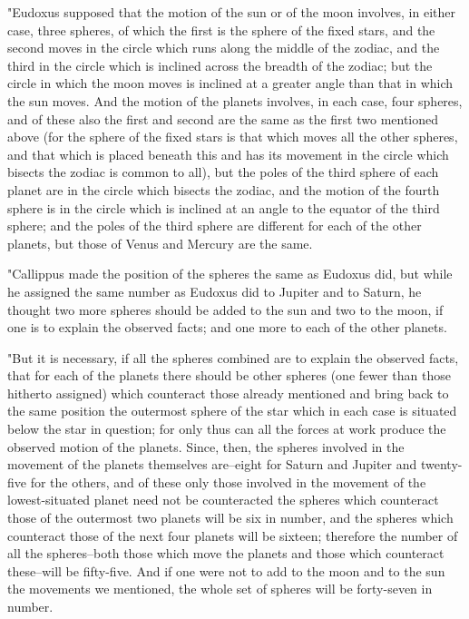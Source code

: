 "Eudoxus supposed that the motion of the sun or of the moon involves,
in either case, three spheres, of which the first is the sphere of
the fixed stars, and the second moves in the circle which runs along
the middle of the zodiac, and the third in the circle which is inclined
across the breadth of the zodiac; but the circle in which the moon
moves is inclined at a greater angle than that in which the sun moves.
And the motion of the planets involves, in each case, four spheres,
and of these also the first and second are the same as the first two
mentioned above (for the sphere of the fixed stars is that which moves
all the other spheres, and that which is placed beneath this and has
its movement in the circle which bisects the zodiac is common to all),
but the poles of the third sphere of each planet are in the circle
which bisects the zodiac, and the motion of the fourth sphere is in
the circle which is inclined at an angle to the equator of the third
sphere; and the poles of the third sphere are different for each of
the other planets, but those of Venus and Mercury are the same.

"Callippus made the position of the spheres the same as Eudoxus did,
but while he assigned the same number as Eudoxus did to Jupiter and
to Saturn, he thought two more spheres should be added to the sun
and two to the moon, if one is to explain the observed facts; and
one more to each of the other planets. 

"But it is necessary, if all the spheres combined are to explain the
observed facts, that for each of the planets there should be other
spheres (one fewer than those hitherto assigned) which counteract
those already mentioned and bring back to the same position the outermost
sphere of the star which in each case is situated below the star in
question; for only thus can all the forces at work produce the observed
motion of the planets. Since, then, the spheres involved in the movement
of the planets themselves are--eight for Saturn and Jupiter and twenty-five
for the others, and of these only those involved in the movement of
the lowest-situated planet need not be counteracted the spheres which
counteract those of the outermost two planets will be six in number,
and the spheres which counteract those of the next four planets will
be sixteen; therefore the number of all the spheres--both those which
move the planets and those which counteract these--will be fifty-five.
And if one were not to add to the moon and to the sun the movements
we mentioned, the whole set of spheres will be forty-seven in number.

